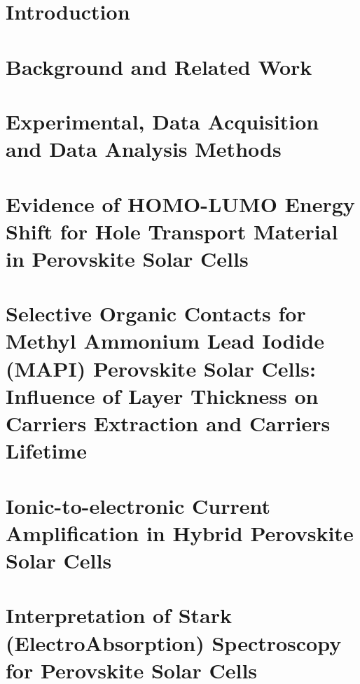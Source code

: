 \documentclass[b5paper, 12pt, openright]{book} %
\begin{document}
\mainmatter
\pagestyle{headings}


\chapter{Introduction}
	\graphicspath{ {./contents_img/intro/} }
	

\chapter{Background and Related Work}
	\graphicspath{ {./contents_img/background/} }
	

\chapter{Experimental, Data Acquisition and Data Analysis Methods}
	\graphicspath{ {./contents_img/methods/} }
	

\chapter{Evidence of HOMO-LUMO Energy Shift for Hole Transport Material in Perovskite Solar Cells}
	\graphicspath{ {./contents_img/tae/} }
	

\chapter{Selective Organic Contacts for Methyl Ammonium Lead Iodide (MAPI) Perovskite Solar Cells: Influence of Layer Thickness on Carriers Extraction and Carriers Lifetime}
	\graphicspath{ {./contents_img/thicknesses/} }
	
	
\chapter{Ionic-to-electronic Current Amplification in Hybrid Perovskite Solar Cells}
	\graphicspath{ {./contents_img/impedance/} }
	
	
\chapter{Interpretation of Stark (ElectroAbsorption) Spectroscopy for Perovskite Solar Cells}
	\graphicspath{ {./contents_img/electroabsorption/} }
	
\end{document}
